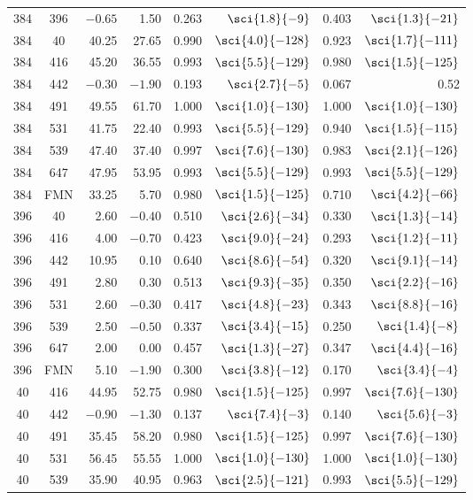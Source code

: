 \begin{longtable}{ccrrrrrr}
384 & 396 & $-0.65$ & 1.50 & 0.263 & $\sci{1.8}{-9}$ & 0.403 & $\sci{1.3}{-21}$ \\
384 & 40  & 40.25 & 27.65 & 0.990 & $\sci{4.0}{-128}$ & 0.923 & $\sci{1.7}{-111}$ \\
384 & 416 & 45.20 & 36.55 & 0.993 & $\sci{5.5}{-129}$ & 0.980 & $\sci{1.5}{-125}$ \\
384 & 442 & $-0.30$ & $-1.90$ & 0.193 & $\sci{2.7}{-5}$ & 0.067 & 0.52 \\
384 & 491 & 49.55 & 61.70 & 1.000 & $\sci{1.0}{-130}$ & 1.000 & $\sci{1.0}{-130}$ \\
384 & 531 & 41.75 & 22.40 & 0.993 & $\sci{5.5}{-129}$ & 0.940 & $\sci{1.5}{-115}$ \\
384 & 539 & 47.40 & 37.40 & 0.997 & $\sci{7.6}{-130}$ & 0.983 & $\sci{2.1}{-126}$ \\
384 & 647 & 47.95 & 53.95 & 0.993 & $\sci{5.5}{-129}$ & 0.993 & $\sci{5.5}{-129}$ \\
384 & FMN & 33.25 & 5.70 & 0.980 & $\sci{1.5}{-125}$ & 0.710 & $\sci{4.2}{-66}$ \\
396 & 40  & 2.60 & $-0.40$ & 0.510 & $\sci{2.6}{-34}$ & 0.330 & $\sci{1.3}{-14}$ \\
396 & 416 & 4.00 & $-0.70$ & 0.423 & $\sci{9.0}{-24}$ & 0.293 & $\sci{1.2}{-11}$ \\
396 & 442 & 10.95 & 0.10 & 0.640 & $\sci{8.6}{-54}$ & 0.320 & $\sci{9.1}{-14}$ \\
396 & 491 & 2.80 & 0.30 & 0.513 & $\sci{9.3}{-35}$ & 0.350 & $\sci{2.2}{-16}$ \\
396 & 531 & 2.60 & $-0.30$ & 0.417 & $\sci{4.8}{-23}$ & 0.343 & $\sci{8.8}{-16}$ \\
396 & 539 & 2.50 & $-0.50$ & 0.337 & $\sci{3.4}{-15}$ & 0.250 & $\sci{1.4}{-8}$ \\
396 & 647 & 2.00 & 0.00 & 0.457 & $\sci{1.3}{-27}$ & 0.347 & $\sci{4.4}{-16}$ \\
396 & FMN & 5.10 & $-1.90$ & 0.300 & $\sci{3.8}{-12}$ & 0.170 & $\sci{3.4}{-4}$ \\
40  & 416 & 44.95 & 52.75 & 0.980 & $\sci{1.5}{-125}$ & 0.997 & $\sci{7.6}{-130}$ \\
40  & 442 & $-0.90$ & $-1.30$ & 0.137 & $\sci{7.4}{-3}$ & 0.140 & $\sci{5.6}{-3}$ \\
40  & 491 & 35.45 & 58.20 & 0.980 & $\sci{1.5}{-125}$ & 0.997 & $\sci{7.6}{-130}$ \\
40  & 531 & 56.45 & 55.55 & 1.000 & $\sci{1.0}{-130}$ & 1.000 & $\sci{1.0}{-130}$ \\
40  & 539 & 35.90 & 40.95 & 0.963 & $\sci{2.5}{-121}$ & 0.993 & $\sci{5.5}{-129}$ \\

\end{longtable}
